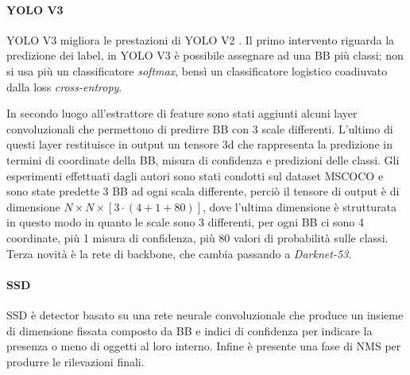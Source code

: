 \paragraph{YOLO V3} 
\ac{YOLO} V3 migliora le prestazioni di \ac{YOLO} V2 \cite{redmon2018yolov3}. Il primo intervento riguarda la predizione dei label, in \ac{YOLO} V3 è possibile assegnare ad una \ac{BB} più classi; non si usa più un classificatore \textit{softmax}, bensì un classificatore logistico coadiuvato dalla loss \textit{cross-entropy}.

In secondo luogo all'estrattore di feature sono stati aggiunti alcuni layer convoluzionali che permettono di predirre \ac{BB} con 3 scale differenti. L'ultimo di questi layer restituisce in output un tensore 3d che rappresenta la predizione in termini di coordinate della \ac{BB}, misura di confidenza e predizioni delle classi. Gli esperimenti effettuati dagli autori sono stati condotti sul dataset \ac{MSCOCO} e sono state predette 3 \ac{BB} ad ogni scala differente, perciò il tensore di output è di dimensione $N \times N \times [3 \cdot (4 + 1 + 80)]$, dove l'ultima dimensione è strutturata in questo modo in quanto le scale sono 3 differenti, per ogni \ac{BB} ci sono 4 coordinate, più 1 misura di confidenza, più $80$ valori di probabilità sulle classi. 
Terza novità è la rete di backbone, che cambia passando a \textit{Darknet-53}.


\paragraph{SSD} 
\ac{SSD} \cite{liu2016ssd} è detector basato su una rete neurale convoluzionale che produce un insieme di dimensione fissata composto da \ac{BB} e indici di confidenza per indicare la presenza o meno di oggetti al loro interno. Infine è presente una fase di \ac{NMS} per produrre le rilevazioni finali. 

